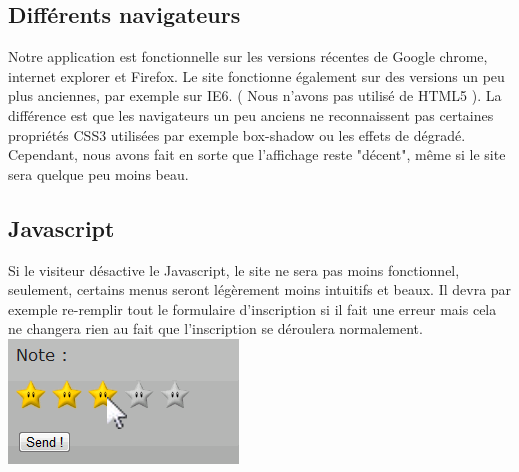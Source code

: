 \subsection{Différents navigateurs}

	Notre application est fonctionnelle sur les versions récentes de Google chrome, internet explorer et Firefox. Le site fonctionne également sur des versions un peu plus anciennes, par exemple sur IE6. ( Nous n'avons pas utilisé de HTML5 ). La différence est que les navigateurs un peu anciens ne reconnaissent pas certaines propriétés CSS3 utilisées par exemple box-shadow ou les effets de dégradé. Cependant, nous avons fait en sorte que l'affichage reste "décent", même si le site sera quelque peu moins beau.

\subsection{Javascript}

	Si le visiteur désactive le Javascript, le site ne sera pas moins fonctionnel, seulement, certains menus seront légèrement moins intuitifs et beaux. Il devra par exemple re-remplir tout le formulaire d'inscription si il fait une erreur mais cela ne changera rien au fait que l'inscription se déroulera normalement.\\
	
\includegraphics[scale=1]{Images/exemplejs.png}
